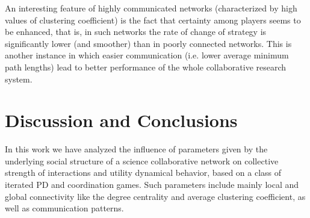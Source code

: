 \documentclass[11pt]{article}
\begin{document}
\FloatBarrier

An interesting feature of highly communicated networks (characterized by high values of clustering coefficient) is the
fact that certainty among players seems to be enhanced, that is, in such networks the rate of change of strategy is
significantly lower (and smoother) than in poorly connected networks. This is another instance in which easier
communication (i.e. lower average minimum path lengths) lead to better performance of the whole collaborative research
system.\\ 


\section{Discussion and Conclusions}
\label{sec:3}

{\color{red}In this work we have analyzed the influence of parameters given by the underlying social structure of a science
collaborative network on collective strength of interactions and utility dynamical behavior, based on a class of iterated
PD and coordination games. Such parameters include mainly local and global connectivity like the degree centrality and
average clustering coefficient, as well as communication patterns.}\\
\end{document}
